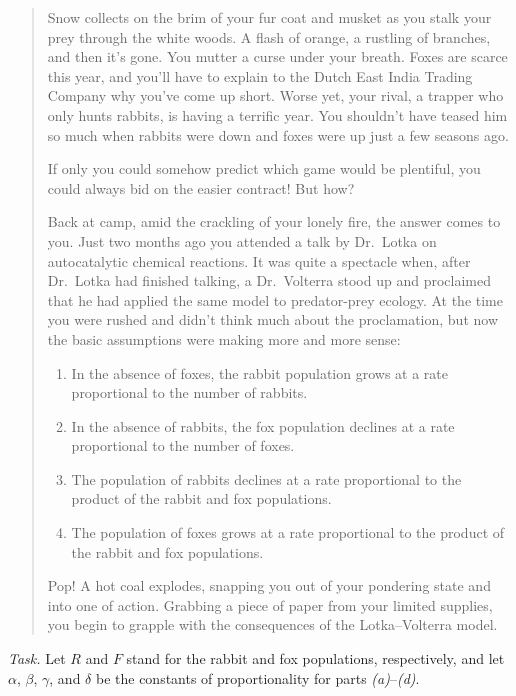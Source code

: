 \begin{quote}
		Snow collects on the brim of your fur coat and musket 
		as you stalk your prey through the white woods.  A flash 
		of orange, a rustling of branches, and then it's
		gone.
		You mutter a curse under your breath.  Foxes are scarce this year, 
		and you'll have to explain to the Dutch East India Trading Company 
		why you've come up short.  Worse yet, your rival, a
		trapper who only hunts 
		rabbits, is having a terrific year.  You shouldn't have teased him so 
		much when rabbits were down and foxes were up just a few seasons ago.

		If only you could somehow predict which game would be plentiful, you could always bid on the easier contract!  But how?

		Back at camp, amid the crackling of your lonely fire, the answer comes to you.  Just two months ago you attended a talk by Dr.~\!Lotka on autocatalytic chemical reactions.  It was quite a spectacle when, after Dr.~\!Lotka had finished talking, a Dr.~\!Volterra stood up and proclaimed 	that he had applied the same model to predator-prey ecology. At the time you were rushed and didn't think much about the proclamation, but now the 	basic assumptions were making more and more sense:

		\begin{enumerate}[label=\emph{(\alph*)}]
			\item In the absence of foxes, the rabbit population grows
				at a rate proportional to the number of rabbits.
			\item In the absence of rabbits, the fox population declines
				at a rate proportional to the number of foxes.
			\item The population of rabbits declines at a rate proportional
				to the product of the rabbit and fox populations.
			\item The population of foxes grows at a rate proportional 
				to the product of the rabbit and fox populations.
		\end{enumerate}

		Pop! A hot coal explodes, snapping you out of your pondering state
		and into one of action.  Grabbing a piece of paper from your limited
		supplies, you begin to grapple with the consequences of the
		Lotka--Volterra model.
	\end{quote}


\emph{Task.} 
	Let $R$ and $F$ stand for the rabbit and fox populations, respectively, and
	let $\alpha$, $\beta$, $\gamma$, and $\delta$ be the constants of proportionality for
	parts \emph{(a)}--\emph{(d)}.

